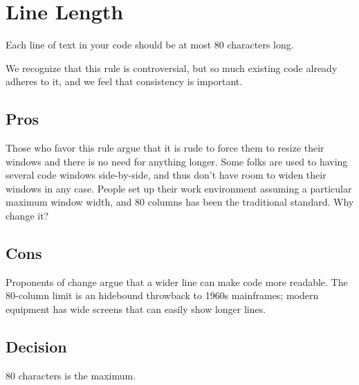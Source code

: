 
\section{Line Length}\label{sec:line-length}
Each line of text in your code should be at most 80 characters long.

We recognize that this rule is controversial, but so much existing code already adheres to it, and we feel that consistency is important.

\subsection{Pros}
Those who favor this rule argue that it is rude to force them to resize their windows and there is no need for anything longer. Some folks are used to having several code windows side-by-side, and thus don't have room to widen their windows in any case. People set up their work environment assuming a particular maximum window width, and 80 columns has been the traditional standard. Why change it?

\subsection{Cons}
Proponents of change argue that a wider line can make code more readable. The 80-column limit is an hidebound throwback to 1960s mainframes; modern equipment has wide screens that can easily show longer lines.

\subsection{Decision}
80 characters is the maximum.

